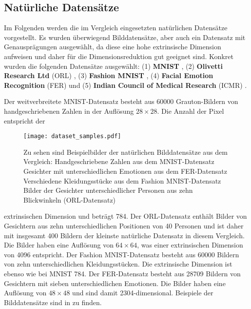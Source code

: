 \subsection{Natürliche Datensätze}
\label{ch:Vergleich:sec:VerwendeteDatensaetze:natuerlich}
Im Folgenden werden die im Vergleich eingesetzten natürlichen Datensätze vorgestellt. Es wurden überwiegend Bilddatensätze, aber auch ein Datensatz mit Genausprägungen ausgewählt, da diese eine
hohe extrinsische Dimension aufweisen und daher für die Dimensionsreduktion gut geeignet sind.
Konkret wurden die folgenden Datensätze ausgewählt: (1) \textbf{MNIST} \parencite{LeCun.2010}, (2) \textbf{Olivetti Research Ltd} (ORL)
\parencite{Samaria.1994}, (3) \textbf{Fashion MNIST} \parencite{Xiao.2017}, (4) \textbf{Facial Emotion Recognition} (FER) \parencite{DumitruIanGoodfellowWillCukierskiYoshuaBengio.2013} und (5) \textbf{Indian Council of
	Medical Research} (ICMR) \parencite{Mohapatra.2022}.

Der weitverbreitete MNIST-Datensatz besteht aus \num{60000} Grauton-Bildern von handgeschriebenen
Zahlen in der Auflösung $28 \times 28$. Die Anzahl der Pixel entspricht der
\begin{figure}[h]
	\begin{center}
		\texttt{[image: dataset\_samples.pdf]}
	\end{center}
	\caption[Beispielbilder der natürlichen Datensätze]{Zu sehen sind Beispielbilder der natürlichen Bilddatensätze aus dem Vergleich: \captiona Handgeschriebene Zahlen aus dem MNIST-Datensatz \captionb Gesichter mit unterschiedlichen Emotionen aus dem FER-Datensatz \captionc Verschiedene Kleidungsstücke aus dem Fashion MNIST-Datensatz \captiond Bilder der Gesichter unterschiedlicher Personen aus zehn Blickwinkeln (ORL-Datensatz)}
	\label{fig:Dataset_samples}
\end{figure}
extrinsischen Dimension und beträgt 784. Der ORL-Datensatz enthält Bilder von Gesichtern aus
zehn unterschiedlichen Positionen von 40 Personen und ist daher mit insgesamt 400 Bildern der kleinste natürliche Datensatz
in diesem Vergleich. Die Bilder haben eine Auflösung von $64 \times 64$, was einer
extrinsischen Dimension von \num{4096} entspricht. Der Fashion MNIST-Datensatz besteht aus \num{60000} Bildern
von zehn unterschiedlichen Kleidungsstücken. Die extrinsische Dimension ist ebenso wie bei MNIST
784. Der FER-Datensatz besteht aus \num{28 709} Bildern von Gesichtern mit sieben unterschiedlichen
Emotionen. Die Bilder haben eine Auflösung von $48 \times 48$ und sind damit \num{2304}-dimensional.
Beispiele der Bilddatensätze sind in  zu finden.

